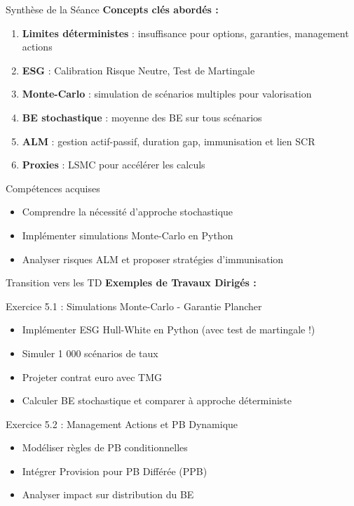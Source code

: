 \documentclass[10pt,aspectratio=169,xcolor={dvipsnames}]{beamer}
\begin{document}
\begin{frame}{Synthèse de la Séance}
\textbf{Concepts clés abordés :}

\begin{enumerate}
    \item \textbf{Limites déterministes} : insuffisance pour options, garanties, management actions
    \item \textbf{ESG} : Calibration Risque Neutre, Test de Martingale
    \item \textbf{Monte-Carlo} : simulation de scénarios multiples pour valorisation
    \item \textbf{BE stochastique} : moyenne des BE sur tous scénarios
    \item \textbf{ALM} : gestion actif-passif, duration gap, immunisation et lien SCR
    \item \textbf{Proxies} : LSMC pour accélérer les calculs
\end{enumerate}

\vspace{0.3cm}
\begin{block}{Compétences acquises}
\begin{itemize}
    \item Comprendre la nécessité d'approche stochastique
    \item Implémenter simulations Monte-Carlo en Python
    \item Analyser risques ALM et proposer stratégies d'immunisation
\end{itemize}
\end{block}
\end{frame}

\begin{frame}{Transition vers les TD}
\textbf{Exemples de Travaux Dirigés :}

\begin{block}{Exercice 5.1 : Simulations Monte-Carlo - Garantie Plancher }
\begin{itemize}
    \item Implémenter ESG Hull-White en Python (avec test de martingale !)
    \item Simuler 1 000 scénarios de taux
    \item Projeter contrat euro avec TMG
    \item Calculer BE stochastique et comparer à approche déterministe
\end{itemize}
\end{block}

\begin{block}{Exercice 5.2 : Management Actions et PB Dynamique }
\begin{itemize}
    \item Modéliser règles de PB conditionnelles
    \item Intégrer Provision pour PB Différée (PPB)
    \item Analyser impact sur distribution du BE
\end{itemize}
\end{block}
\end{frame}
\end{document}
